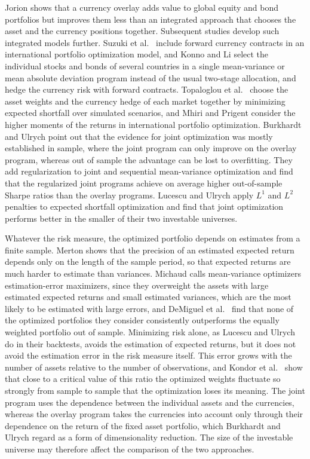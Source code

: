 Jorion \cite{Jorion1994} shows that a currency overlay adds value to global equity and bond portfolios but improves them
less than an integrated approach that chooses the asset and the currency positions together. Subsequent studies develop
such integrated models further. Suzuki et al.~\cite{SuzukiKonnoMorjiri1997} include forward currency contracts in an
international portfolio optimization model, and Konno and Li \cite{KonnoLi1998, KonnoLi2000} select the individual stocks
and bonds of several countries in a single mean-variance or mean absolute deviation program instead of the usual
two-stage allocation, and hedge the currency risk with forward contracts. Topaloglou et
al.~\cite{TopaloglouVladimirouZenios2002} choose the asset weights and the currency hedge of each market together by
minimizing expected shortfall over simulated scenarios, and Mhiri and Prigent \cite{MhiriPrigent2010} consider the
higher moments of the returns in international portfolio optimization. Burkhardt and Ulrych
\cite{SparseAndStableInternationalPortfolioOptimization} point out that the evidence for joint optimization was mostly
established in sample, where the joint program can only improve on the overlay program, whereas out of sample the
advantage can be lost to overfitting. They add regularization to joint and sequential mean-variance optimization and
find that the regularized joint programs achieve on average higher out-of-sample Sharpe ratios than the overlay
programs. Lucescu and Ulrych \cite{RegularizedMultiCurrencyExpectedShortfallPortfolios} apply $L^1$ and $L^2$ penalties
to expected shortfall optimization and find that joint optimization performs better in the smaller of their two
investable universes. 

Whatever the risk measure, the optimized portfolio depends on estimates from a finite sample. Merton \cite{Merton1980}
shows that the precision of an estimated expected return depends only on the length of the sample period, so that
expected returns are much harder to estimate than variances. Michaud \cite{Michaud1989} calls mean-variance optimizers
estimation-error maximizers, since they overweight the assets with large estimated expected returns and small estimated
variances, which are the most likely to be estimated with large errors, and DeMiguel et al.~\cite{DeMiguelGarlappiUppal2009}
find that none of the optimized portfolios they consider consistently outperforms the equally weighted portfolio out of
sample. Minimizing risk alone, as Lucescu and Ulrych do in their backtests, avoids the estimation of expected returns, but
 it does not avoid the estimation error in
the risk measure itself. This error grows with the number of assets relative to the number of observations, and Kondor
et al.~\cite{kondor2007noise} show that close to a critical value of this ratio the optimized weights fluctuate so
strongly from sample to sample that the optimization loses its meaning. The joint program uses the dependence between
the individual assets and the currencies, whereas the overlay program takes the currencies into account only through
their dependence on the return of the fixed asset portfolio, which Burkhardt and Ulrych regard as a form of
dimensionality reduction. The size of the investable universe may therefore affect the comparison of the two
approaches.

